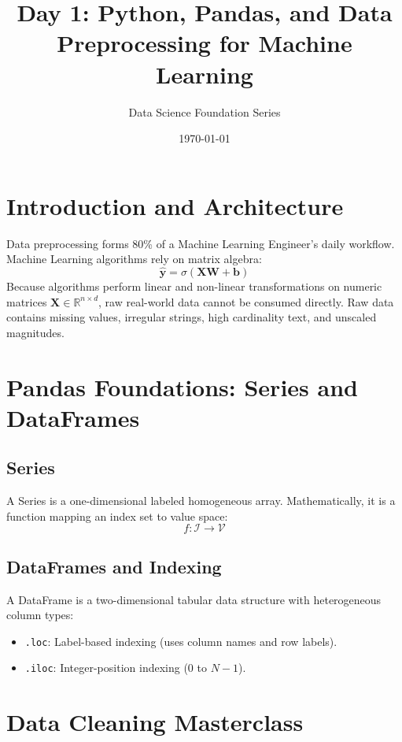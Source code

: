 \documentclass[11pt,a4paper]{article}
\title{\textbf{Day 1: Python, Pandas, and Data Preprocessing for Machine Learning}}
\author{Data Science Foundation Series}
\date{\today}
\begin{document}
\maketitle

\tableofcontents
\newpage

\section{Introduction and Architecture}
Data preprocessing forms 80\% of a Machine Learning Engineer's daily workflow. Machine Learning algorithms rely on matrix algebra:
\begin{equation}
\mathbf{\hat{y}} = \sigma(\mathbf{X}\mathbf{W} + \mathbf{b})
\end{equation}
Because algorithms perform linear and non-linear transformations on numeric matrices $\mathbf{X} \in \mathbb{R}^{n \times d}$, raw real-world data cannot be consumed directly. Raw data contains missing values, irregular strings, high cardinality text, and unscaled magnitudes.

\section{Pandas Foundations: Series and DataFrames}
\subsection{Series}
A Series is a one-dimensional labeled homogeneous array. Mathematically, it is a function mapping an index set to value space:
\begin{equation}
f: \mathcal{I} \to \mathcal{V}
\end{equation}

\subsection{DataFrames and Indexing}
A DataFrame is a two-dimensional tabular data structure with heterogeneous column types:
\begin{itemize}
    \item \texttt{.loc}: Label-based indexing (uses column names and row labels).
    \item \texttt{.iloc}: Integer-position indexing (0 to $N-1$).
\end{itemize}

\section{Data Cleaning Masterclass}
\end{document}
